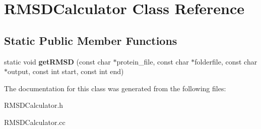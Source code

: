 \hypertarget{classRMSDCalculator}{\section{R\-M\-S\-D\-Calculator Class Reference}
\label{classRMSDCalculator}
}
\subsection*{Static Public Member Functions}
\begin{DoxyCompactItemize}
\item 
\hypertarget{classRMSDCalculator_a2441d557a270e56c81226f6266434dc8}{static void {\bfseries get\-R\-M\-S\-D} (const char $\ast$protein\-\_\-file, const char $\ast$folderfile, const char $\ast$output, const int start, const int end)}\label{classRMSDCalculator_a2441d557a270e56c81226f6266434dc8}

\end{DoxyCompactItemize}


The documentation for this class was generated from the following files\-:\begin{DoxyCompactItemize}
\item 
R\-M\-S\-D\-Calculator.\-h\item 
R\-M\-S\-D\-Calculator.\-cc\end{DoxyCompactItemize}
